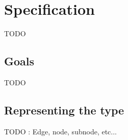 \chapter{Specification} %
\label{cha:Specification}

TODO

\section{Goals} %
\label{sec:Goals}

TODO

\section{Representing the type} %
\label{sec:Representing the type}

TODO : Edge, node, subnode, etc...






